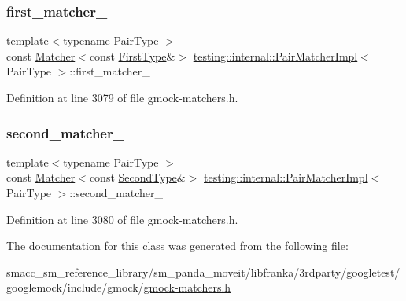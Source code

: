 \subsubsection{\texorpdfstring{first\+\_\+matcher\+\_\+}{first\_matcher\_}}
{\footnotesize\ttfamily template$<$typename Pair\+Type $>$ \\
const \hyperlink{classtesting_1_1Matcher}{Matcher}$<$const \hyperlink{classtesting_1_1internal_1_1PairMatcherImpl_a9de66d76f0ebb0f107a9c18903b03176}{First\+Type}\&$>$ \hyperlink{classtesting_1_1internal_1_1PairMatcherImpl}{testing\+::internal\+::\+Pair\+Matcher\+Impl}$<$ Pair\+Type $>$\+::first\+\_\+matcher\+\_\+\hspace{0.3cm}{\ttfamily [private]}}



Definition at line 3079 of file gmock-\/matchers.\+h.

\mbox{\label{classtesting_1_1internal_1_1PairMatcherImpl_a2341ad72afa02dcadb98c531cada3576}} 
\subsubsection{\texorpdfstring{second\+\_\+matcher\+\_\+}{second\_matcher\_}}
{\footnotesize\ttfamily template$<$typename Pair\+Type $>$ \\
const \hyperlink{classtesting_1_1Matcher}{Matcher}$<$const \hyperlink{classtesting_1_1internal_1_1PairMatcherImpl_ad63c9ff4f1aff81562efca293ff5aca9}{Second\+Type}\&$>$ \hyperlink{classtesting_1_1internal_1_1PairMatcherImpl}{testing\+::internal\+::\+Pair\+Matcher\+Impl}$<$ Pair\+Type $>$\+::second\+\_\+matcher\+\_\+\hspace{0.3cm}{\ttfamily [private]}}



Definition at line 3080 of file gmock-\/matchers.\+h.



The documentation for this class was generated from the following file\+:\begin{DoxyCompactItemize}
\item 
smacc\+\_\+sm\+\_\+reference\+\_\+library/sm\+\_\+panda\+\_\+moveit/libfranka/3rdparty/googletest/googlemock/include/gmock/\hyperlink{gmock-matchers_8h}{gmock-\/matchers.\+h}\end{DoxyCompactItemize}
